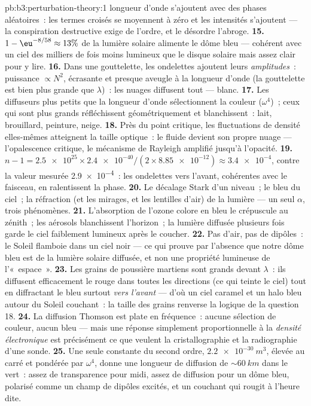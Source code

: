 \begin{solution}{pb:b3:perturbation-theory:1}
longueur d'onde s'ajoutent avec des phases aléatoires~: les termes
croisés se moyennent à zéro et les intensités s'ajoutent --- la
conspiration destructive exige de l'ordre, et le désordre l'abroge.
\textbf{15.} $1 - \eu^{-8/58} \approx 13\%$ de la lumière solaire
alimente le dôme bleu --- cohérent avec un ciel des milliers de fois
moins lumineux que le disque solaire mais assez clair pour y lire.
\textbf{16.} Dans une gouttelette, les ondelettes ajoutent leurs
\emph{amplitudes}~: puissance $\propto N^2$, écrasante et presque
aveugle à la longueur d'onde (la gouttelette est bien plus grande que
$\lambda$)~: les nuages diffusent tout --- blanc.
\textbf{17.} Les diffuseurs plus petits que la longueur d'onde
sélectionnent la couleur ($\omega^4$)~; ceux qui sont plus grands
réfléchissent géométriquement et blanchissent~: lait, brouillard,
peinture, neige.
\textbf{18.} Près du point critique, les fluctuations de densité
elles-mêmes atteignent la taille optique~: le fluide devient son
propre nuage --- l'opalescence critique, le mécanisme de Rayleigh
amplifié jusqu'à l'opacité.
\textbf{19.} $n - 1 = \num{2.5e25} \times \num{2.4e-40}/(2 \times
\num{8.85e-12}) \approx \num{3.4e-4}$, contre la valeur mesurée
\num{2.9e-4}~: les ondelettes vers l'avant, cohérentes avec le
faisceau, en ralentissent la phase.
\textbf{20.} Le décalage Stark d'un niveau~; le bleu du ciel~; la
réfraction (et les mirages, et les lentilles d'air) de la lumière ---
un seul $\alpha$, trois phénomènes.
\textbf{21.} L'absorption de l'ozone colore en bleu le crépuscule au
zénith~; les aérosols blanchissent l'horizon~; la lumière diffusée
plusieurs fois garde le ciel faiblement lumineux après le coucher.
\textbf{22.} Pas d'air, pas de dipôles~: le Soleil flamboie dans un
ciel noir --- ce qui prouve par l'absence que notre dôme bleu est de
la lumière solaire diffusée, et non une propriété lumineuse de
l'«~espace~».
\textbf{23.} Les grains de poussière martiens sont grands devant
$\lambda$~: ils diffusent efficacement le rouge dans toutes les
directions (ce qui teinte le ciel) tout en diffractant le bleu surtout
\emph{vers l'avant} --- d'où un ciel caramel et un halo bleu autour du
Soleil couchant~: la taille des grains renverse la logique de la
question 18.
\textbf{24.} La diffusion Thomson est plate en fréquence~: aucune
sélection de couleur, aucun bleu --- mais une réponse simplement
proportionnelle à la \emph{densité électronique} est précisément ce
que veulent la cristallographie et la radiographie d'une sonde.
\textbf{25.} Une seule constante du second ordre,
$\qty{2.2e-30}{m^3}$, élevée au carré et pondérée par $\omega^4$,
donne une longueur de diffusion de $\sim\qty{60}{km}$ dans le vert~:
assez de transparence pour midi, assez de diffusion pour un dôme bleu,
polarisé comme un champ de dipôles excités, et un couchant qui
rougit à l'heure dite.
\end{solution}
